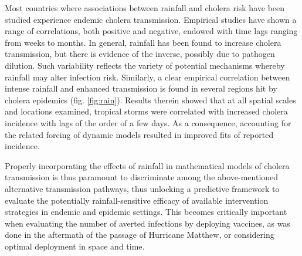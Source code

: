 Most countries where associations between rainfall and cholera risk have been studied experience endemic cholera transmission. Empirical studies have shown a range of correlations, both positive and negative, endowed with time lags ranging from weeks to months. In general, rainfall has been found to increase cholera transmission, but there is evidence of the inverse, possibly due to pathogen dilution. Such variability reflects the variety of potential mechanisms whereby rainfall may alter infection risk. Similarly, a clear empirical correlation between intense rainfall and enhanced transmission is found in several regions hit by cholera epidemics (fig. \ref{fig:rain}). Results therein showed that at all spatial scales and locations examined, tropical storms were correlated with increased cholera incidence with lags of the order of a few days. As a consequence, accounting for the related forcing of dynamic models resulted in improved fits of reported incidence. 

Properly incorporating the effects of rainfall in mathematical models of cholera transmission is thus paramount to discriminate among the above-mentioned alternative transmission pathways, thus unlocking a predictive framework to evaluate the potentially rainfall-sensitive efficacy of available intervention strategies in endemic and epidemic settings. This becomes critically important when evaluating the number of averted infections by deploying vaccines, as was done in the aftermath of the passage of Hurricane Matthew, or considering optimal deployment in space and time.

